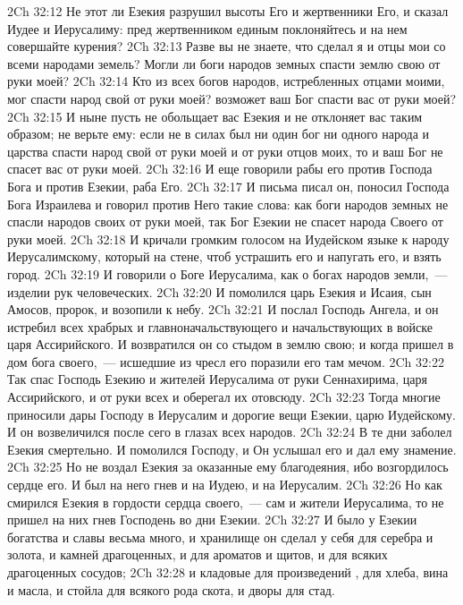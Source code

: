 \vs 2Ch 32:12 Не этот ли Езекия разрушил высоты Его и жертвенники Его, и сказал Иудее и Иерусалиму: пред жертвенником единым поклоняйтесь и на нем совершайте курения?
\vs 2Ch 32:13 Разве вы не знаете, что сделал я и отцы мои со всеми народами земель? Могли ли боги народов земных спасти землю свою от руки моей?
\vs 2Ch 32:14 Кто из всех богов народов, истребленных отцами моими, мог спасти народ свой от руки моей?  возможет ваш Бог спасти вас от руки моей?
\vs 2Ch 32:15 И ныне пусть не обольщает вас Езекия и не отклоняет вас таким образом; не верьте ему: если не в силах был ни один бог ни одного народа и царства спасти народ свой от руки моей и от руки отцов моих, то и ваш Бог не спасет вас от руки моей.
\vs 2Ch 32:16 И еще  говорили рабы его против Господа Бога и против Езекии, раба Его.
\vs 2Ch 32:17 И письма писал он,  поносил Господа Бога Израилева и говорил против Него такие слова: как боги народов земных не спасли народов своих от руки моей, так Бог Езекии не спасет народа Своего от руки моей.
\vs 2Ch 32:18 И кричали громким голосом на Иудейском языке к народу Иерусалимскому, который  на стене, чтоб устрашить его и напугать его, и взять город.
\vs 2Ch 32:19 И говорили о Боге Иерусалима, как о богах народов земли,~--- изделии рук человеческих.
\vs 2Ch 32:20 И помолился царь Езекия и Исаия, сын Амосов, пророк, и возопили к небу.
\vs 2Ch 32:21 И послал Господь Ангела, и он истребил всех храбрых и главноначальствующего и начальствующих в войске царя Ассирийского. И возвратился он со стыдом в землю свою; и когда пришел в дом бога своего,~--- исшедшие из чресл его поразили его там мечом.
\vs 2Ch 32:22 Так спас Господь Езекию и жителей Иерусалима от руки Сеннахирима, царя Ассирийского, и от руки всех и оберегал их отовсюду.
\vs 2Ch 32:23 Тогда многие приносили дары Господу в Иерусалим и дорогие вещи Езекии, царю Иудейскому. И он возвеличился после сего в глазах всех народов.
\rsbpar\vs 2Ch 32:24 В те дни заболел Езекия смертельно. И помолился Господу, и Он услышал его и дал ему знамение.
\vs 2Ch 32:25 Но не воздал Езекия за оказанные ему благодеяния, ибо возгордилось сердце его. И был на него гнев  и на Иудею, и на Иерусалим.
\vs 2Ch 32:26 Но как смирился Езекия в гордости сердца своего,~--- сам и жители Иерусалима, то не пришел на них гнев Господень во дни Езекии.
\vs 2Ch 32:27 И было у Езекии богатства и славы весьма много, и хранилище он сделал у себя для серебра и золота, и камней драгоценных, и для ароматов и щитов, и для всяких драгоценных сосудов;
\vs 2Ch 32:28 и кладовые для произведений , для хлеба, вина и масла, и стойла для всякого рода скота, и дворы для стад.
